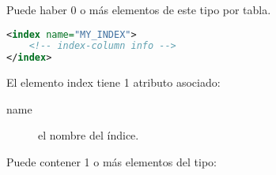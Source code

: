 Puede haber 0 o más elementos de este tipo por tabla.

\begin{lstlisting}[language=xml]
<index name="MY_INDEX">
	<!-- index-column info -->
</index>
\end{lstlisting}

El elemento index tiene 1 atributo asociado:

\begin{description}
	\item[name] el nombre del índice. 
\end{description}

Puede contener 1 o más elementos  del tipo: